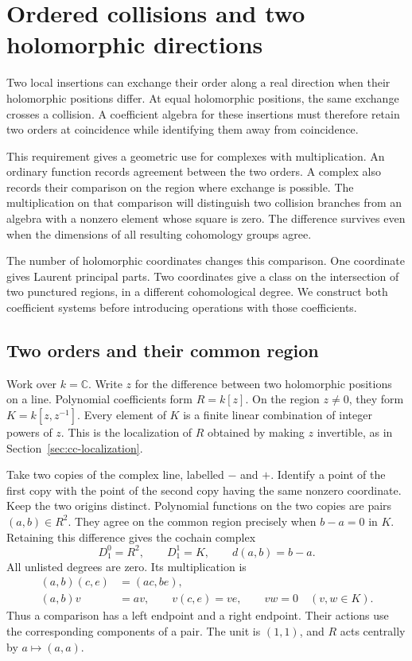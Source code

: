 \chapter{Ordered collisions and two holomorphic directions}
\label{chap:ordered-collisions-residues}

Two local insertions can exchange their order along a real direction
when their holomorphic positions differ. At equal holomorphic positions,
the same exchange crosses a collision. A coefficient algebra for these
insertions must therefore retain two orders at coincidence while
identifying them away from coincidence.

This requirement gives a geometric use for complexes with multiplication.
An ordinary function records agreement between the two orders.
A complex also records their comparison on the region where exchange is
possible. The multiplication on that comparison will distinguish two
collision branches from an algebra with a nonzero element whose square
is zero.
The difference survives even when the dimensions of all resulting
cohomology groups agree.

The number of holomorphic coordinates changes this comparison.
One coordinate gives Laurent principal parts. Two coordinates give a
class on the intersection of two punctured regions, in a different
cohomological degree. We construct both coefficient systems before
introducing operations with those coefficients.

\section{Two orders and their common region}

Work over $k=\mathbb C$. Write $z$ for the difference between two
holomorphic positions on a line. Polynomial coefficients form $R=k[z]$.
On the region $z\ne0$, they form $K=k[z,z^{-1}]$.
Every element of $K$ is a finite linear combination of integer powers
of $z$. This is the localization of $R$ obtained by making $z$
invertible, as in Section~\ref{sec:cc-localization}.

Take two copies of the complex line, labelled $-$ and $+$.
Identify a point of the first copy with the point of the second copy
having the same nonzero coordinate. Keep the two origins distinct.
Polynomial functions on the two copies are pairs $(a,b)\in R^2$.
They agree on the common region precisely when $b-a=0$ in $K$.
Retaining this difference gives the cochain complex
\[
 D_1^0=R^2,\qquad D_1^1=K,\qquad d(a,b)=b-a.
\]
All unlisted degrees are zero. Its multiplication is
\begin{equation}\label{eq:ocr-ordered-cup}
 \begin{split}
 (a,b)(c,e)&=(ac,be),\\
 (a,b)v&=av,\qquad v(c,e)=ve,\qquad vw=0
 \quad(v,w\in K).
 \end{split}
\end{equation}
Thus a comparison has a left endpoint and a right endpoint.
Their actions use the corresponding components of a pair.
The unit is $(1,1)$, and $R$ acts centrally by $a\mapsto(a,a)$.

